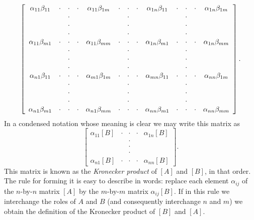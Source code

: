 \begin{equation*}
    \left[
    \begin{array}{*{13}c}
        \alpha_{11}\beta_{11} & \cdot & \cdot & \cdot & \alpha_{11}\beta_{1m} & \cdot & \cdot & \cdot & \alpha_{1n}\beta_{11} & \cdot & \cdot & \cdot & \alpha_{1n}\beta_{1m} \\
        {} & {} & \cdot & {} & {} & {} & \cdot & {} & {} & {} & \cdot & {} & {} \\
        {} & {} & \cdot & {} & {} & {} & \cdot & {} & {} & {} & \cdot & {} & {} \\
        {} & {} & \cdot & {} & {} & {} & \cdot & {} & {} & {} & \cdot & {} & {} \\
        \alpha_{11}\beta_{m1} & \cdot & \cdot & \cdot & \alpha_{11}\beta_{mm} & \cdot & \cdot & \cdot & \alpha_{1n}\beta_{m1} & \cdot & \cdot & \cdot & \alpha_{1n}\beta_{mm} \\
        {} & {} & \cdot & {} & {} & {} & \cdot & {} & {} & {} & \cdot & {} & {} \\
        {} & {} & \cdot & {} & {} & {} & \cdot & {} & {} & {} & \cdot & {} & {} \\
        {} & {} & \cdot & {} & {} & {} & \cdot & {} & {} & {} & \cdot & {} & {} \\
        \alpha_{n1}\beta_{11} & \cdot & \cdot & \cdot & \alpha_{m1}\beta_{1m} & \cdot & \cdot & \cdot & \alpha_{mn}\beta_{11} & \cdot & \cdot & \cdot & \alpha_{nn}\beta_{1m} \\
        {} & {} & \cdot & {} & {} & {} & \cdot & {} & {} & {} & \cdot & {} & {} \\
        {} & {} & \cdot & {} & {} & {} & \cdot & {} & {} & {} & \cdot & {} & {} \\
        {} & {} & \cdot & {} & {} & {} & \cdot & {} & {} & {} & \cdot & {} & {} \\
        \alpha_{n1}\beta_{m1} & \cdot & \cdot & \cdot & \alpha_{n1}\beta_{mm} & \cdot & \cdot & \cdot & \alpha_{nn}\beta_{m1} & \cdot & \cdot & \cdot & \alpha_{nn}\beta_{mm}
    \end{array}
    \right].
\end{equation*}
In a condensed notation whose meaning is clear we may write this matrix as
\begin{equation*}
    \begin{bmatrix}
        \alpha_{11}[B] & \cdot & \cdot & \cdot & \alpha_{1n}[B] \\
        {} & {} & \cdot & {} & {} \\
        {} & {} & \cdot & {} & {} \\
        {} & {} & \cdot & {} & {} \\
        \alpha_{n1}[B] & \cdot & \cdot & \cdot & \alpha_{nn}[B]
    \end{bmatrix}.
\end{equation*}
This matrix is known as the \emph{Kronecker product} of \([A]\) and \([B]\), in
that order. The rule for forming it is easy to describe in words: replace each
element \(\alpha_{ij}\) of the \(n\)-by-\(n\) matrix \([A]\) by the
\(m\)-by-\(m\) matrix \(\alpha_{ij}[B]\). If in this rule we interchange the
roles of \(A\) and \(B\) (and consequently interchange \(n\) and \(m\)) we
obtain the definition of the Kronecker product of \([B]\) and \([A]\).

